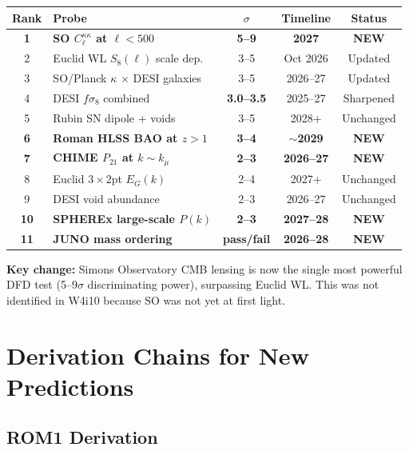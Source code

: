 \documentclass[11pt,a4paper]{article}
\begin{document}
\begin{center}
\begin{tabular}{clccc}
\toprule
\textbf{Rank} & \textbf{Probe} & \textbf{$\sigma$} &
\textbf{Timeline} & \textbf{Status} \\
\midrule
\textbf{1} & \textbf{SO $C_\ell^{\kappa\kappa}$ at $\ell < 500$} &
\textbf{5--9} & \textbf{2027} & \textbf{NEW} \\
2 & Euclid WL $S_8(\ell)$ scale dep. & 3--5 & Oct 2026 & Updated \\
3 & SO/Planck $\kappa$ $\times$ DESI galaxies & 3--5 &
2026--27 & Updated \\
4 & DESI $f\sigma_8$ combined & \textbf{3.0--3.5} &
2025--27 & Sharpened \\
5 & Rubin SN dipole + voids & 3--5 & 2028+ & Unchanged \\
\textbf{6} & \textbf{Roman HLSS BAO at $z > 1$} &
\textbf{3--4} & \textbf{$\sim$2029} & \textbf{NEW} \\
\textbf{7} & \textbf{CHIME $P_{21}$ at $k \sim k_\mu$} &
\textbf{2--3} & \textbf{2026--27} & \textbf{NEW} \\
8 & Euclid $3\times 2$pt $E_G(k)$ & 2--4 & 2027+ & Unchanged \\
9 & DESI void abundance & 2--3 & 2026--27 & Unchanged \\
\textbf{10} & \textbf{SPHEREx large-scale $P(k)$} &
\textbf{2--3} & \textbf{2027--28} & \textbf{NEW} \\
\textbf{11} & \textbf{JUNO mass ordering} &
\textbf{pass/fail} & \textbf{2026--28} & \textbf{NEW} \\
\bottomrule
\end{tabular}
\end{center}

\textbf{Key change:} Simons Observatory CMB lensing is now the single
most powerful DFD test (5--9$\sigma$ discriminating power), surpassing
Euclid WL. This was not identified in W4i10 because SO was not yet at
first light.

\section{Derivation Chains for New Predictions}
\label{sec:derivations}

\subsection{ROM1 Derivation}
\end{document}
